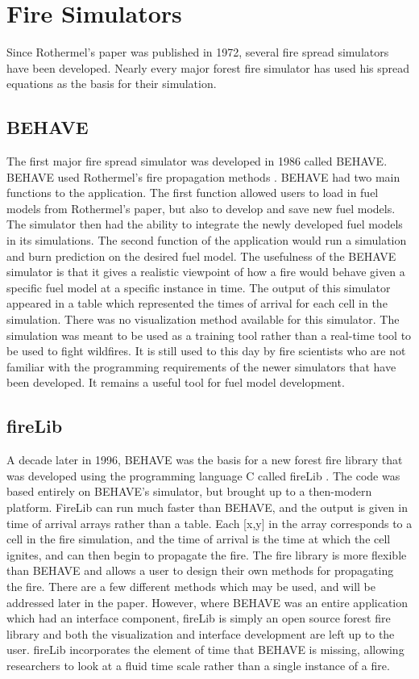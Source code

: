 \section{Fire Simulators}
Since Rothermel's paper was published in 1972, several fire spread simulators have been developed. Nearly every major forest fire simulator has used his spread equations as the basis for their simulation. 

\subsection{BEHAVE}
The first major fire spread simulator was developed in 1986 called BEHAVE\cite{BEHAVE}. BEHAVE used Rothermel's fire propagation methods \cite{roth}. BEHAVE had two main functions to the application. The first function allowed users to load in fuel models from Rothermel's paper, but also to develop and save new fuel models. The simulator then had the ability to integrate the newly developed fuel models in its simulations. The second function of the application would run a simulation and burn prediction on the desired fuel model. The usefulness of the BEHAVE simulator is that it gives a realistic viewpoint of how a fire would behave given a specific fuel model at a specific instance in time. The output of this simulator appeared in a table which represented the times of arrival for each cell in the simulation. There was no visualization method available for this simulator. The simulation was meant to be used as a training tool rather than a real-time tool to be used to fight wildfires. It is still used to this day by fire scientists who are not familiar with the programming requirements of the newer simulators that have been developed. It remains a useful tool for fuel model development. 

\subsection{fireLib}
A decade later in 1996, BEHAVE was the basis for a new forest fire library that was developed using the programming language C called fireLib \cite{fireLib}. The code was based entirely on BEHAVE's simulator, but brought up to a then-modern platform. FireLib can run much faster than BEHAVE, and the output is given in time of arrival arrays rather than a table. Each [x,y] in the array corresponds to a cell in the fire simulation, and the time of arrival is the time at which the cell ignites, and can then begin to propagate the fire. The fire library is more flexible than BEHAVE and allows a user to design their own methods for propagating the fire. There are a few different methods which may be used, and will be addressed later in the paper. However, where BEHAVE was an entire application which had an interface component, fireLib is simply an open source forest fire library and both the visualization and interface development are left up to the user. fireLib incorporates the element of time that BEHAVE is missing, allowing researchers to look at a fluid time scale rather than a single instance of a fire. 

